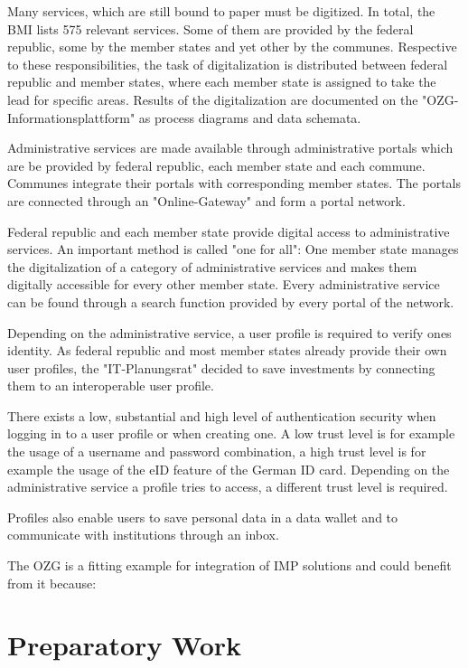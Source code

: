 \documentclass[
     12pt,         %
     a4paper,      %
     BCOR=10mm,version=first,     %
     DIV=14,version=first,        %
     ]{scrreprt}
\begin{document}
Many services, which are still bound to paper must be digitized. In total, the BMI lists 575 relevant services. Some of them are provided by the federal republic, some by the member states and yet other by the communes. Respective to these responsibilities, the task of digitalization is distributed between federal republic and member states, where each member state is assigned to take the lead for specific areas. \cite{BMI:Onlinezugangsgesetz} Results of the digitalization are documented on the "OZG-Informationsplattform" \cite{BMI:Informatiosplattform} as process diagrams and data schemata.

Administrative services are made available through administrative portals which are be provided by federal republic, each member state and each commune. Communes integrate their portals with corresponding member states. The portals are connected through an "Online-Gateway" and form a portal network.

Federal republic and each member state provide digital access to administrative services. An important method is called "one for all": One member state manages the digitalization of a category of administrative services and makes them digitally accessible for every other member state. Every administrative service can be found through a search function provided by every portal of the network.

Depending on the administrative service, a user profile is required to verify ones identity. As federal republic and most member states already provide their own user profiles, the "IT-Planungsrat" decided to save investments by connecting them to an interoperable user profile.

There exists a low, substantial and high level of authentication security when logging in to a user profile or when creating one.
A low trust level is for example the usage of a username and password combination, a high trust level is for example the usage of the eID feature of the German ID card. Depending on the administrative service a profile tries to access, a different trust level is required.

Profiles also enable users to save personal data in a data wallet and to communicate with institutions through an inbox.

The OZG is a fitting example for integration of IMP solutions and could benefit from it because:

\chapter{Preparatory Work}
\end{document}
